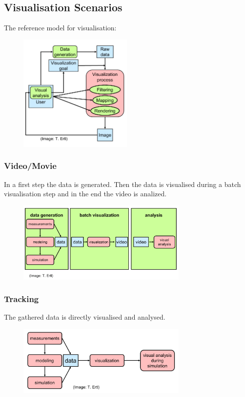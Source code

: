 \subsection{Visualisation Scenarios}
The reference model for visualisation:
\begin{figure}[H]
    \centering
    \includegraphics[width=0.5\textwidth]{img/01_vis_scenarios}
\end{figure}
\subsubsection{Video/Movie}
In a first step the data is generated. Then the data is visualised during a batch visualisation step and in the end the video is analized. 
\begin{figure}[H]
    \centering
    \includegraphics[width=0.75\textwidth]{img/01_movie_mode}
\end{figure}

\subsubsection{Tracking}
The gathered data is directly visualised and analysed.
\begin{figure}[H]
    \centering
    \includegraphics[width=0.75\textwidth]{img/01_tracking}
\end{figure}
